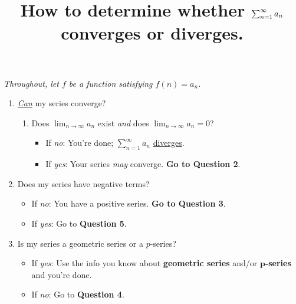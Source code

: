 \documentclass[10pt]{article}
\title{\vspace{-0.75in}\Large{How to determine whether $\ser$ converges or diverges.}\vspace{-0.75in}}
\date{}
\newcommand{\infsum}[3]{\sum_{{#1}={#2}}^\infty {#3}}
\newcommand{\ser}{\infsum{n}{1}{a_n}}
\begin{document}
	\maketitle
	\vspace{-0.125in}
	\begin{center}
	\textit{Throughout, let $f$ be a function satisfying $f(n)=a_n$.}
	\end{center}

	\begin{enumerate}
		\item \textit{\ul{Can}} my series converge?
		\begin{enumerate}
			\item Does $\lim_{n\to\infty} a_n$ exist \textit{and} does $\lim_{n\to\infty}a_n=0$?
			\begin{itemize}
					\item If \textit{no}: You're done; $\ser$ \ul{diverges}.
					\item If \textit{yes}: Your series \textit{may} converge. \textbf{Go to Question 2}.
			\end{itemize}
		\end{enumerate}
	
		\item Does my series have negative terms?
			\begin{itemize}
				\item If \textit{no}: You have a positive series. \textbf{Go to Question 3}.
				\item If \textit{yes}: Go to \textbf{Question 5}.
			\end{itemize}
		
		\item Is my series a geometric series or a $p$-series?
			\begin{itemize}
				\item If \textit{yes}: Use the info you know about \textbf{geometric series} and/or \textbf{$\boldsymbol{p}$-series} and you're done.
				\item If \textit{no}: Go to \textbf{Question 4}.
			\end{itemize}
		

\end{enumerate}
\end{document}
